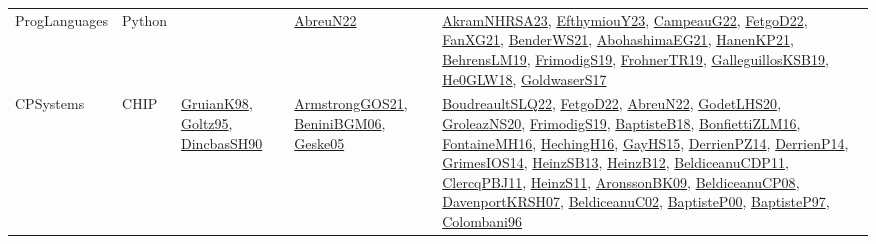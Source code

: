 {\begin{longtable}{lp{3cm}>{\raggedright}p{6cm}>{\raggedright}p{6cm}p{8cm}}
ProgLanguages & Python &  & \href{articles/AbreuN22.pdf}{AbreuN22}\cite{AbreuN22} & \href{articles/AkramNHRSA23.pdf}{AkramNHRSA23}\cite{AkramNHRSA23}, \href{papers/EfthymiouY23.pdf}{EfthymiouY23}\cite{EfthymiouY23}, \href{articles/CampeauG22.pdf}{CampeauG22}\cite{CampeauG22}, \href{articles/FetgoD22.pdf}{FetgoD22}\cite{FetgoD22}, \href{articles/FanXG21.pdf}{FanXG21}\cite{FanXG21}, \href{papers/BenderWS21.pdf}{BenderWS21}\cite{BenderWS21}, \href{articles/AbohashimaEG21.pdf}{AbohashimaEG21}\cite{AbohashimaEG21}, \href{papers/HanenKP21.pdf}{HanenKP21}\cite{HanenKP21}, \href{papers/BehrensLM19.pdf}{BehrensLM19}\cite{BehrensLM19}, \href{papers/FrimodigS19.pdf}{FrimodigS19}\cite{FrimodigS19}, \href{papers/FrohnerTR19.pdf}{FrohnerTR19}\cite{FrohnerTR19}, \href{papers/GalleguillosKSB19.pdf}{GalleguillosKSB19}\cite{GalleguillosKSB19}, \href{papers/He0GLW18.pdf}{He0GLW18}\cite{He0GLW18}, \href{papers/GoldwaserS17.pdf}{GoldwaserS17}\cite{GoldwaserS17}\\
CPSystems & CHIP & \href{papers/GruianK98.pdf}{GruianK98}\cite{GruianK98}, \href{papers/Goltz95.pdf}{Goltz95}\cite{Goltz95}, \href{articles/DincbasSH90.pdf}{DincbasSH90}\cite{DincbasSH90} & \href{papers/ArmstrongGOS21.pdf}{ArmstrongGOS21}\cite{ArmstrongGOS21}, \href{papers/BeniniBGM06.pdf}{BeniniBGM06}\cite{BeniniBGM06}, \href{papers/Geske05.pdf}{Geske05}\cite{Geske05} & \href{papers/BoudreaultSLQ22.pdf}{BoudreaultSLQ22}\cite{BoudreaultSLQ22}, \href{articles/FetgoD22.pdf}{FetgoD22}\cite{FetgoD22}, \href{articles/AbreuN22.pdf}{AbreuN22}\cite{AbreuN22}, \href{papers/GodetLHS20.pdf}{GodetLHS20}\cite{GodetLHS20}, \href{papers/GroleazNS20.pdf}{GroleazNS20}\cite{GroleazNS20}, \href{papers/FrimodigS19.pdf}{FrimodigS19}\cite{FrimodigS19}, \href{articles/BaptisteB18.pdf}{BaptisteB18}\cite{BaptisteB18}, \href{papers/BonfiettiZLM16.pdf}{BonfiettiZLM16}\cite{BonfiettiZLM16}, \href{papers/FontaineMH16.pdf}{FontaineMH16}\cite{FontaineMH16}, \href{papers/HechingH16.pdf}{HechingH16}\cite{HechingH16}, \href{papers/GayHS15.pdf}{GayHS15}\cite{GayHS15}, \href{papers/DerrienPZ14.pdf}{DerrienPZ14}\cite{DerrienPZ14}, \href{papers/DerrienP14.pdf}{DerrienP14}\cite{DerrienP14}, \href{articles/GrimesIOS14.pdf}{GrimesIOS14}\cite{GrimesIOS14}, \href{articles/HeinzSB13.pdf}{HeinzSB13}\cite{HeinzSB13}, \href{papers/HeinzB12.pdf}{HeinzB12}\cite{HeinzB12}, \href{articles/BeldiceanuCDP11.pdf}{BeldiceanuCDP11}\cite{BeldiceanuCDP11}, \href{papers/ClercqPBJ11.pdf}{ClercqPBJ11}\cite{ClercqPBJ11}, \href{papers/HeinzS11.pdf}{HeinzS11}\cite{HeinzS11}, \href{papers/AronssonBK09.pdf}{AronssonBK09}\cite{AronssonBK09}, \href{papers/BeldiceanuCP08.pdf}{BeldiceanuCP08}\cite{BeldiceanuCP08}, \href{papers/DavenportKRSH07.pdf}{DavenportKRSH07}\cite{DavenportKRSH07}, \href{papers/BeldiceanuC02.pdf}{BeldiceanuC02}\cite{BeldiceanuC02}, \href{articles/BaptisteP00.pdf}{BaptisteP00}\cite{BaptisteP00}, \href{papers/BaptisteP97.pdf}{BaptisteP97}\cite{BaptisteP97}, \href{papers/Colombani96.pdf}{Colombani96}\cite{Colombani96}\\

\end{longtable}}
